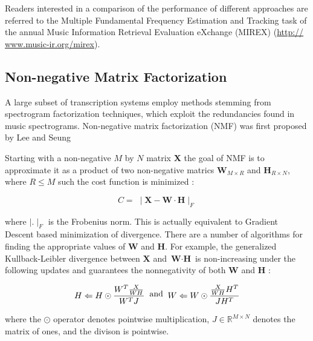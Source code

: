 Readers interested in a comparison of the performance of different approaches
are referred to the Multiple Fundamental Frequency Estimation and Tracking task
of the annual Music Information Retrieval Evaluation eXchange (MIREX)
(\url{http:// www.music-ir.org/mirex}).


\subsection{Non-negative Matrix Factorization}

A large subset of transcription systems employ methods stemming from spectrogram
factorization techniques, which exploit the redundancies found in music
spectrograms. Non-negative matrix factorization (NMF) was first proposed by Lee
and Seung \cite{nmf1999:Seung}


Starting with a non-negative $M$ by $N$ matrix \textbf{X} the goal of NMF is to
approximate it as a product of two non-negative matrics $ \textbf{W}_{M \times
    R}$ and $\textbf{H}_{R \times N}$, where $R \leq M$ such the cost function is
minimized :

\begin{equation}
  C = \;\mid \textbf{X} - \textbf{W}\cdot \textbf{H} \mid _ {F}
\end{equation}

where $\mid . \mid_{F}$ is the Frobenius norm. This is actually equivalent to
Gradient Descent based minimization of divergence. \cite{nmfamt2003:Smaragdis}
There are a number of algorithms for finding the appropriate values of
\textbf{W} and \textbf{H}. For example, the generalized Kullback-Leibler
divergence between \textbf{X} and $\textbf{W}\cdot \textbf{H}$ is non-increasing
under the following updates and guarantees the nonnegativity of both \textbf{W}
and \textbf{H} :

\begin{equation}
  \begin{split}
    H \Leftarrow H \odot \frac{W^{T}\frac{X}{WH}}{W^{T}J}
  \end{split}
  \text{\;\;and\;\;}
  \begin{split}
    W \Leftarrow W \odot \frac{\frac{X}{WH}H^{T}}{JH^{T}}
  \end{split}
  \label{review:eq:gradient_rules}
\end{equation}

where the $\odot$ operator denotes pointwise multiplication, $J \in
  \mathbb{R}^{M \times N}$ denotes the matrix of ones, and the divison is
pointwise. \cite{amt2019:Benetos}

